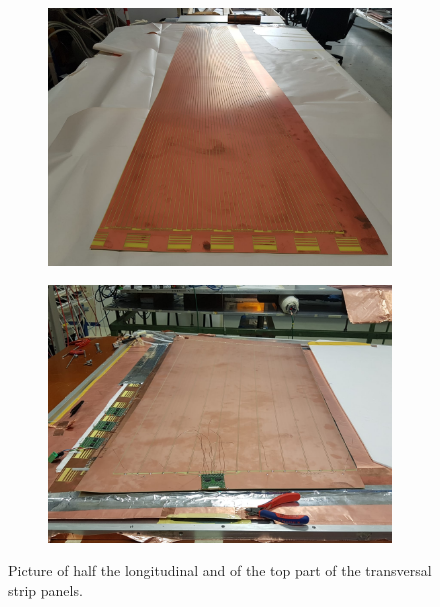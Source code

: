     \begin{figure}[H]
		\begin{subfigure}{.5\linewidth}
		    \centering
			\includegraphics[width = .9\linewidth]{fig/chapt6/INFN-FEB-Longitudinal.png}
			\caption{\label{fig:INFN_StripPic:A}}
		\end{subfigure}
		\begin{subfigure}{.5\linewidth}
		    \centering
			\includegraphics[width = .9\linewidth]{fig/chapt6/INFN-FEB-Transversal.png}
			\caption{\label{fig:INFN_StripPic:B}}
		\end{subfigure}
		\caption{\label{fig:INFN_StripPic} Picture of half the longitudinal  and of the top part of the transversal  strip panels.}
    \end{figure}
	
